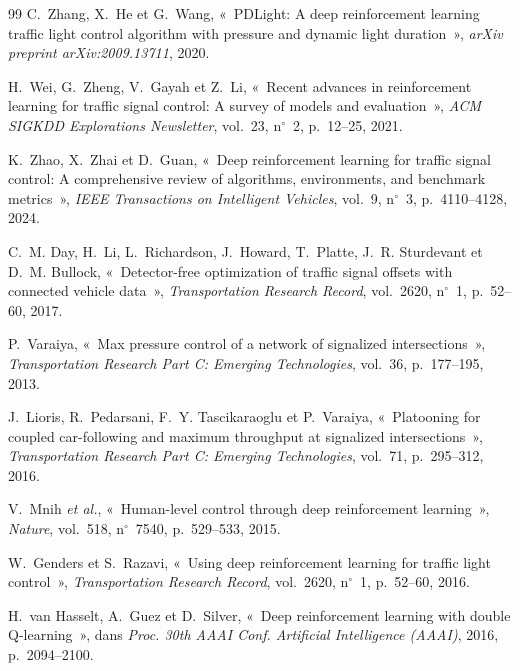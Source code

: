 \documentclass[10pt,twocolumn,letterpaper]{article}
\begin{document}
\begin{thebibliography}{99}
C.~Zhang, X.~He et G.~Wang, «~PDLight: A deep reinforcement learning traffic light control algorithm with pressure and dynamic light duration~», \emph{arXiv preprint arXiv:2009.13711}, 2020.

H.~Wei, G.~Zheng, V.~Gayah et Z.~Li, «~Recent advances in reinforcement learning for traffic signal control: A survey of models and evaluation~», \emph{ACM SIGKDD Explorations Newsletter}, vol.~23, n$^\circ$~2, p.~12--25, 2021.

K.~Zhao, X.~Zhai et D.~Guan, «~Deep reinforcement learning for traffic signal control: A comprehensive review of algorithms, environments, and benchmark metrics~», \emph{IEEE Transactions on Intelligent Vehicles}, vol.~9, n$^\circ$~3, p.~4110--4128, 2024.

C.~M. Day, H.~Li, L.~Richardson, J.~Howard, T.~Platte, J.~R. Sturdevant et D.~M. Bullock, «~Detector-free optimization of traffic signal offsets with connected vehicle data~», \emph{Transportation Research Record}, vol.~2620, n$^\circ$~1, p.~52--60, 2017.

P.~Varaiya, «~Max pressure control of a network of signalized intersections~», \emph{Transportation Research Part C: Emerging Technologies}, vol.~36, p.~177--195, 2013.

J.~Lioris, R.~Pedarsani, F.~Y. Tascikaraoglu et P.~Varaiya, «~Platooning for coupled car-following and maximum throughput at signalized intersections~», \emph{Transportation Research Part C: Emerging Technologies}, vol.~71, p.~295--312, 2016.

V.~Mnih \emph{et al.}, «~Human-level control through deep reinforcement learning~», \emph{Nature}, vol.~518, n$^\circ$~7540, p.~529--533, 2015.

W.~Genders et S.~Razavi, «~Using deep reinforcement learning for traffic light control~», \emph{Transportation Research Record}, vol.~2620, n$^\circ$~1, p.~52--60, 2016.

H.~van Hasselt, A.~Guez et D.~Silver, «~Deep reinforcement learning with double Q-learning~», dans \emph{Proc. 30th AAAI Conf. Artificial Intelligence (AAAI)}, 2016, p.~2094--2100.

\end{thebibliography}
\end{document}
